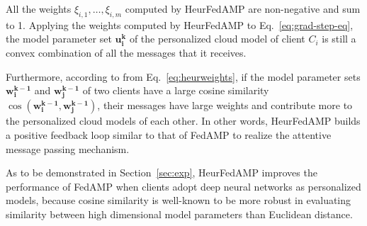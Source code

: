 All the weights $\xi_{i,1}, \ldots, \xi_{i,m}$ computed by HeurFedAMP are non-negative and sum to 1. Applying the weights computed by HeurFedAMP to Eq.~\eqref{eq:grad-step-eq}, the model parameter set $\mathbf{u_i^k}$ of the personalized cloud model of client $C_i$ is still a convex combination of all the messages that it receives.

Furthermore, according to from Eq.~\eqref{eq:heurweights}, 
if the model parameter sets $\mathbf{w_i^{k-1}}$ and $\mathbf{w_j^{k-1}}$ of two clients have a large cosine similarity $\cos(\mathbf{w_i^{k-1}}, \mathbf{w_j^{k-1}})$, their messages have large weights and contribute more to the personalized cloud models of each other. In other words, HeurFedAMP builds a positive feedback loop similar to that of FedAMP to realize the attentive message passing mechanism.

As to be demonstrated in Section~\ref{sec:exp}, HeurFedAMP improves the performance of FedAMP when clients adopt deep neural networks as personalized models, because cosine similarity is well-known to be more robust in evaluating similarity between high dimensional model parameters than Euclidean distance.














